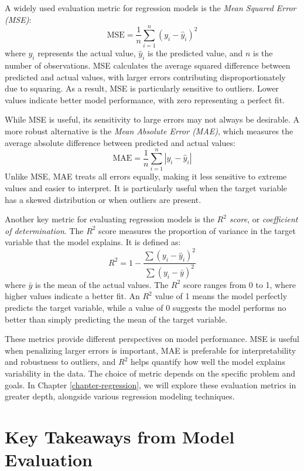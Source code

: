 \documentclass[
]{book}
\theoremstyle{definition}
\theoremstyle{definition}
\theoremstyle{definition}
\theoremstyle{definition}
\theoremstyle{remark}
\begin{document}
A widely used evaluation metric for regression models is the \emph{Mean Squared Error (MSE)}:
\[
\text{MSE} = \frac{1}{n} \sum_{i=1}^{n} (y_i - \hat{y}_i)^2
\]
where \(y_i\) represents the actual value, \(\hat{y}_i\) is the predicted value, and \(n\) is the number of observations. MSE calculates the average squared difference between predicted and actual values, with larger errors contributing disproportionately due to squaring. As a result, MSE is particularly sensitive to outliers. Lower values indicate better model performance, with zero representing a perfect fit.

While MSE is useful, its sensitivity to large errors may not always be desirable. A more robust alternative is the \emph{Mean Absolute Error (MAE)}, which measures the average absolute difference between predicted and actual values:
\[
\text{MAE} = \frac{1}{n} \sum_{i=1}^{n} |y_i - \hat{y}_i|
\]
Unlike MSE, MAE treats all errors equally, making it less sensitive to extreme values and easier to interpret. It is particularly useful when the target variable has a skewed distribution or when outliers are present.

Another key metric for evaluating regression models is the \emph{\(R^2\) score}, or \emph{coefficient of determination}. The \(R^2\) score measures the proportion of variance in the target variable that the model explains. It is defined as:
\[
R^2 = 1 - \frac{\sum (y_i - \hat{y}_i)^2}{\sum (y_i - \bar{y})^2}
\]
where \(\bar{y}\) is the mean of the actual values. The \(R^2\) score ranges from 0 to 1, where higher values indicate a better fit. An \(R^2\) value of 1 means the model perfectly predicts the target variable, while a value of 0 suggests the model performs no better than simply predicting the mean of the target variable.

These metrics provide different perspectives on model performance. MSE is useful when penalizing larger errors is important, MAE is preferable for interpretability and robustness to outliers, and \(R^2\) helps quantify how well the model explains variability in the data. The choice of metric depends on the specific problem and goals. In Chapter \ref{chapter-regression}, we will explore these evaluation metrics in greater depth, alongside various regression modeling techniques.

\section{Key Takeaways from Model Evaluation}\label{key-takeaways-from-model-evaluation}
\end{document}
